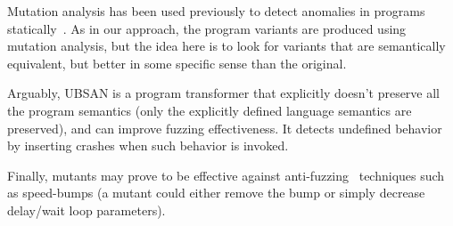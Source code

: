 Mutation analysis has been used previously to detect anomalies in programs
statically~\cite{arcaini2017novel}. As in our approach, the program variants
are produced using mutation analysis, but the idea here is to look for variants
that are semantically equivalent, but better in some specific sense than the
original.

Arguably, UBSAN is a program transformer that explicitly doesn't preserve all the program
semantics (only the explicitly defined language semantics are preserved), and can improve fuzzing effectiveness.
It detects undefined behavior by inserting crashes when such behavior is invoked.

Finally, mutants may prove to be effective against anti-fuzzing~\cite{jung2019fuzzification}
techniques such as speed-bumps (a mutant could either remove the bump or simply decrease delay/wait loop parameters).

